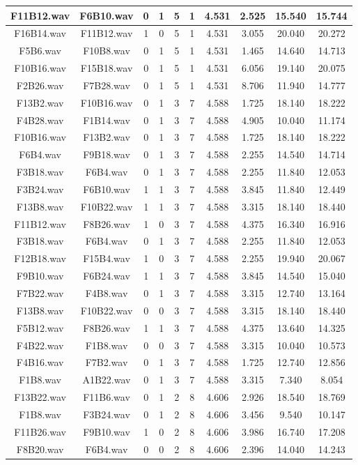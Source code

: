 \documentclass[11pt,a4paper,twoside]{book}
\begin{document}
\begin{longtable}[c]{|c|c|c|c|c|c|c|c|c|c|}
F11B12.wav&F6B10.wav&0&1&5&1&4.531&2.525&15.540&15.744\\ \hline
F16B14.wav&F11B12.wav&1&0&5&1&4.531&3.055&20.040&20.272\\ \hline
F5B6.wav&F10B8.wav&0&1&5&1&4.531&1.465&14.640&14.713\\ \hline
F10B16.wav&F15B18.wav&0&1&5&1&4.531&6.056&19.140&20.075\\ \hline
F2B26.wav&F7B28.wav&0&1&5&1&4.531&8.706&11.940&14.777\\ \hline
F13B2.wav&F10B16.wav&0&1&3&7&4.588&1.725&18.140&18.222\\ \hline
F4B28.wav&F1B14.wav&0&1&3&7&4.588&4.905&10.040&11.174\\ \hline
F10B16.wav&F13B2.wav&0&1&3&7&4.588&1.725&18.140&18.222\\ \hline
F6B4.wav&F9B18.wav&0&1&3&7&4.588&2.255&14.540&14.714\\ \hline
F3B18.wav&F6B4.wav&0&1&3&7&4.588&2.255&11.840&12.053\\ \hline
F3B24.wav&F6B10.wav&1&1&3&7&4.588&3.845&11.840&12.449\\ \hline
F13B8.wav&F10B22.wav&1&1&3&7&4.588&3.315&18.140&18.440\\ \hline
F11B12.wav&F8B26.wav&1&0&3&7&4.588&4.375&16.340&16.916\\ \hline
F3B18.wav&F6B4.wav&0&1&3&7&4.588&2.255&11.840&12.053\\ \hline
F12B18.wav&F15B4.wav&1&0&3&7&4.588&2.255&19.940&20.067\\ \hline
F9B10.wav&F6B24.wav&1&1&3&7&4.588&3.845&14.540&15.040\\ \hline
F7B22.wav&F4B8.wav&0&1&3&7&4.588&3.315&12.740&13.164\\ \hline
F13B8.wav&F10B22.wav&0&0&3&7&4.588&3.315&18.140&18.440\\ \hline
F5B12.wav&F8B26.wav&1&1&3&7&4.588&4.375&13.640&14.325\\ \hline
F4B22.wav&F1B8.wav&0&0&3&7&4.588&3.315&10.040&10.573\\ \hline
F4B16.wav&F7B2.wav&0&1&3&7&4.588&1.725&12.740&12.856\\ \hline
F1B8.wav&A1B22.wav&0&1&3&7&4.588&3.315&7.340&8.054\\ \hline
F13B22.wav&F11B6.wav&0&1&2&8&4.606&2.926&18.540&18.769\\ \hline
F1B8.wav&F3B24.wav&0&1&2&8&4.606&3.456&9.540&10.147\\ \hline
F11B26.wav&F9B10.wav&1&0&2&8&4.606&3.986&16.740&17.208\\ \hline
F8B20.wav&F6B4.wav&0&0&2&8&4.606&2.396&14.040&14.243\\ \hline

\end{longtable}
\end{document}
